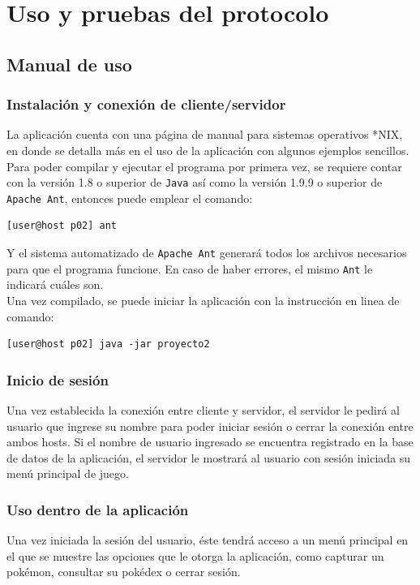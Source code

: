 \documentclass[12pt]{article}
\begin{document}
\section{Uso y pruebas del protocolo}
\subsection{Manual de uso}
\subsubsection{Instalación y conexión de cliente/servidor}
La aplicación cuenta con una página de manual para sistemas operativos *NIX, en donde se detalla más en el uso de la aplicación con algunos ejemplos sencillos. \\
Para poder compilar y ejecutar el programa por primera vez, se requiere contar con la versión 1.8 o superior de \texttt{Java} así como la versión 1.9.9 o superior de \texttt{Apache Ant}, entonces puede emplear el comando: \\
\begin{verbatim}
[user@host p02] ant 
\end{verbatim}
Y el sistema automatizado de \texttt{Apache Ant} generará todos los archivos necesarios para que el programa funcione. En caso de haber errores, el mismo \texttt{Ant} le indicará cuáles son. \\

Una vez compilado, se puede iniciar la aplicación con la instrucción en linea de comando:
\begin{verbatim}
[user@host p02] java -jar proyecto2 
\end{verbatim}

\subsubsection{Inicio de sesión}
Una vez establecida la conexión entre cliente y servidor, el servidor le pedirá al usuario que ingrese su nombre para poder iniciar sesión o cerrar la conexión entre ambos hosts. Si el nombre de usuario ingresado se encuentra registrado en la base de datos de la aplicación, el servidor le mostrará al usuario con sesión iniciada su menú principal de juego.

\subsubsection{Uso dentro de la aplicación}
Una vez iniciada la sesión del usuario, éste tendrá acceso a un menú principal en el que se muestre las opciones que le otorga la aplicación, como capturar un pokémon, consultar su pokédex o cerrar sesión. \\
\end{document}
